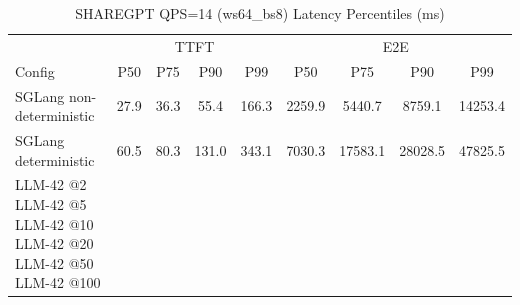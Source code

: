 \begin{table}[htbp]
\centering
\caption{SHAREGPT QPS=14 (ws64_bs8) Latency Percentiles (ms)}
\label{tab:sharegpt_qps14_ws64_bs8}
\begin{tabular}{l|cccc|cccc}
\toprule
& \multicolumn{4}{c|}{TTFT} & \multicolumn{4}{c}{E2E} \\
Config & P50 & P75 & P90 & P99 & P50 & P75 & P90 & P99 \\
\midrule
SGLang non-deterministic & 27.9 & 36.3 & 55.4 & 166.3 & 2259.9 & 5440.7 & 8759.1 & 14253.4 \\
SGLang deterministic & 60.5 & 80.3 & 131.0 & 343.1 & 7030.3 & 17583.1 & 28028.5 & 47825.5 \\
LLM-42 @2%
LLM-42 @5%
LLM-42 @10%
LLM-42 @20%
LLM-42 @50%
LLM-42 @100%
\bottomrule
\end{tabular}
\end{table}
